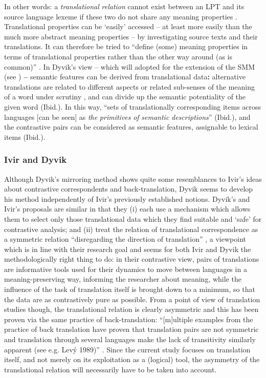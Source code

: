 In other words: a \textit{translational} \textit{relation} cannot exist between an LPT and its source language lexeme if these two do not share any meaning properties \citep[218]{hasselgard_complexity_1999}. Translational properties can be ‘easily’ accessed – at least more easily than the much more abstract meaning properties – by investigating source texts and their translations. It can therefore be tried to “define (some) meaning properties in terms of translational properties rather than the other way around (as is common)” \citep[218]{hasselgard_complexity_1999}. In Dyvik’s view – which will adopted for the extension of the SMM (see ) \textbf{–} semantic features can be derived from translational data\textbf{:} alternative translations are related to different aspects or related sub-senses of the meaning of a word under scrutiny \citep[31]{langemets_translations_2005}, and can divide up the semantic potentiality of the given word (Ibid.). In this way, “sets of translationally corresponding items across languages [can be seen] as \textit{the} \textit{primitives} \textit{of} \textit{semantic} \textit{descriptions}” (Ibid.), and the contrastive pairs can be considered as semantic features, assignable to lexical items (Ibid.).

\subsubsection{Ivir and Dyvik} 
\label{sec:2.3.4.3}  
Although Dyvik’s mirroring method shows quite some resemblances to Ivir’s ideas about contrastive correspondents and back-translation, Dyvik seems to develop his method independently of Ivir’s previously established notions. Dyvik’s and Ivir’s proposals are similar in that they (i) each use a mechanism which allows them to select only those translational data which they find suitable and ‘safe’ for contrastive analysis; and (ii) treat the relation of translational correspondence as a symmetric relation “disregarding the direction of translation” \citep[314]{aijmer_translations_2004}, a viewpoint which is in line with their research goal and seems for both Ivir and Dyvik the methodologically right thing to do: in their contrastive view, pairs of translations are informative tools used for their dynamics to move between languages in a meaning-preserving way, informing the researcher about meaning, while the influence of the task of translation itself is brought down to a minimum, so that the data are as contrastively pure as possible. From a point of view of translation studies though, the translational relation is clearly asymmetric and this has been proven via the same practice of back-translation: “[m]ultiple examples from the practice of back translation have proven that translation pairs are not symmetric and translation through several languages make the lack of transitivity similarly apparent (see e.g. Levý 1989)” \citep[211]{halverson_concept_1997}. Since the current study focuses on translation itself, and not merely on its exploitation as a (logical) tool, the asymmetry of the translational relation will necessarily have to be taken into account.

